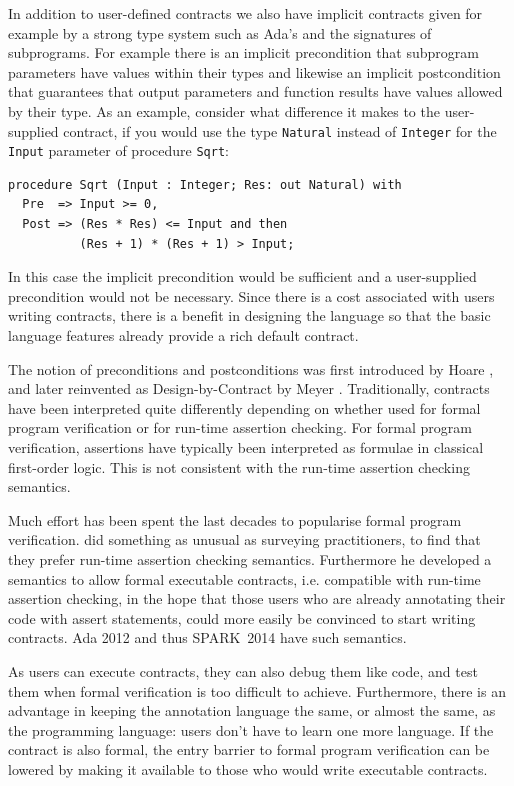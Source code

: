 \documentclass[sttt,final]{svjour}
\newcommand{\newspark}{SPARK~2014\xspace}
\begin{document}
In addition to user-defined contracts we also have implicit contracts
given for example by a strong type system such as Ada's and the
signatures of subprograms. For example there is an implicit
precondition that subprogram parameters have values within their types
and likewise an implicit postcondition that guarantees that output
parameters and function results have values allowed by their type. As
an example, consider what difference it makes to the user-supplied
contract, if you would use the type \verb|Natural| instead of
\verb|Integer| for the \verb|Input| parameter of procedure \verb|Sqrt|:

\begin{lstlisting}
procedure Sqrt (Input : Integer; Res: out Natural) with
  Pre  => Input >= 0,
  Post => (Res * Res) <= Input and then
          (Res + 1) * (Res + 1) > Input;
\end{lstlisting}

In this case the implicit precondition would be sufficient and a
user-supplied precondition would not be necessary. Since there is a
cost associated with users writing contracts, there is a benefit in
designing the language so that the basic language features already
provide a rich default contract.

The notion of preconditions and postconditions was first introduced by Hoare
\cite{hoare69cacm}, and later reinvented as Design-by-Contract by Meyer
\cite{meyer:1988:OSC}. Traditionally, contracts have been interpreted quite
differently depending on whether used for formal program verification or for
run-time assertion checking. For formal program verification, assertions have
typically been interpreted as formulae in classical first-order logic. This is
not consistent with the run-time assertion checking semantics.

Much effort has been spent the last decades to popularise formal
program verification. \cite{tseChalin10} did something as unusual as
surveying practitioners, to find that they prefer run-time assertion
checking semantics. Furthermore he developed a semantics to allow
formal executable contracts, i.e. compatible with run-time assertion
checking, in the hope that those users who are already annotating
their code with assert statements, could more easily be convinced to
start writing contracts. Ada 2012 and thus \newspark have such
semantics.

As users can execute contracts, they can also debug them like code, and test
them when formal verification is too difficult to achieve.
Furthermore, there is an advantage in keeping the annotation language
the same, or almost the same, as the programming language: users
don't have to learn one more language. If the contract is also formal,
the entry barrier to formal program verification can be lowered by
making it available to those who would write executable contracts.
\end{document}
